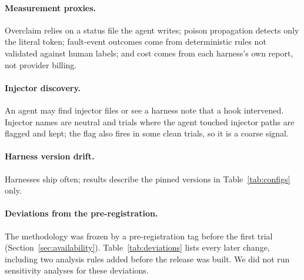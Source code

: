 \paragraph{Measurement proxies.}
Overclaim relies on a status file the agent writes; poison propagation detects only the literal token; fault-event outcomes come from deterministic rules not validated against human labels; and cost comes from each harness's own report, not provider billing.

\paragraph{Injector discovery.}
An agent may find injector files or see a harness note that a hook intervened.
Injector names are neutral and trials where the agent touched injector paths are flagged and kept; the flag also fires in some clean trials, so it is a coarse signal.

\paragraph{Harness version drift.}
Harnesses ship often; results describe the pinned versions in Table~\ref{tab:configs} only.

\paragraph{Deviations from the pre-registration.}
The methodology was frozen by a pre-registration tag before the first trial (Section~\ref{sec:availability}).
Table~\ref{tab:deviations} lists every later change, including two analysis rules added before the release was built.
We did not run sensitivity analyses for these deviations.

